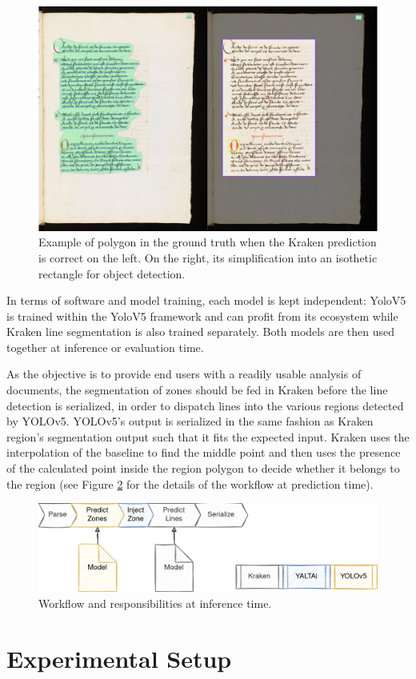 \documentclass{jdmdh}
\begin{document}
\begin{figure}
    \centering
    \includegraphics[width=.5\linewidth]{images/rectangulisation.jpg}
    \caption{Example of polygon in the ground truth when the Kraken prediction is correct on the left. On the right, its simplification into an isothetic rectangle for object detection.}
    \label{fig:yaltai:rectangulisation}
\end{figure}

In terms of software and model training, each model is kept independent: YoloV5 is trained within the YoloV5 framework and can profit from its ecosystem while Kraken line segmentation is also trained separately. Both models are then used together at inference or evaluation time.

As the objective is to provide end users with a readily usable analysis of documents, the segmentation of zones should be fed in Kraken before the line detection is serialized, in order to dispatch lines into the various regions detected by YOLOv5. YOLOv5's output is serialized in the same fashion as Kraken region's segmentation output such that it fits the expected input. Kraken uses the interpolation of the baseline to find the middle point and then uses the presence of the calculated point inside the region polygon to decide whether it belongs to the region (see Figure \ref{fig:yaltai:injection} for the details of the workflow at prediction time).

\begin{figure}
    \centering
    \includegraphics[width=.8\linewidth]{images/yaltaiinjection.png}
    \caption{Workflow and responsibilities at inference time.}
    \label{fig:yaltai:injection}
\end{figure}

\section{Experimental Setup}
\end{document}

